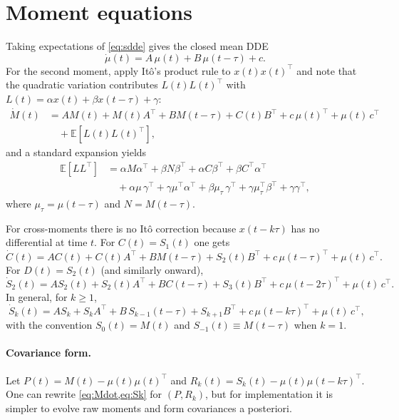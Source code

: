 \documentclass[11pt]{article}
\begin{document}
\section{Moment equations}
Taking expectations of \eqref{eq:sdde} gives the closed mean DDE
\begin{equation}\label{eq:mean}
  \dot\mu(t) = A\,\mu(t) + B\,\mu(t-\tau) + c.
\end{equation}
For the second moment, apply It\^o's product rule to $x(t)x(t)^\top$ and note that the quadratic variation contributes $L(t)L(t)^\top$ with
$L(t)=\alpha x(t)+\beta x(t-\tau)+\gamma$:
\begin{align}\label{eq:Mdot}
  \dot M(t) &= A M(t) + M(t)A^\top + B M(t-\tau) + C(t) B^\top + c\,\mu(t)^\top + \mu(t)\,c^\top
  \nonumber\\
  &\quad + \mathbb{E}\!\left[L(t)L(t)^\top\right],
\end{align}
and a standard expansion yields
\begin{align}\label{eq:ELLT}
\mathbb{E}\!\left[L L^\top\right] &=
  \alpha M\alpha^\top + \beta N\beta^\top + \alpha C\beta^\top + \beta C^\top\alpha^\top
  \nonumber\\
&\quad + \alpha\mu\,\gamma^\top + \gamma\mu^\top\alpha^\top
      + \beta\mu_\tau\,\gamma^\top + \gamma\mu_\tau^\top\beta^\top + \gamma\gamma^\top,
\end{align}
where $\mu_\tau=\mu(t-\tau)$ and $N=M(t-\tau)$.

For cross-moments there is no It\^o correction because $x(t-k\tau)$ has no differential at time $t$.
For $C(t)=S_1(t)$ one gets
\begin{equation}\label{eq:Cd}
  \dot C(t) = A C(t) + C(t)A^\top + B M(t-\tau) + S_2(t) B^\top + c\,\mu(t-\tau)^\top + \mu(t)\,c^\top.
\end{equation}
For $D(t)=S_2(t)$ (and similarly onward),
\begin{equation}\label{eq:Dd}
  \dot S_2(t) = A S_2(t) + S_2(t)A^\top + B C(t-\tau) + S_3(t) B^\top + c\,\mu(t-2\tau)^\top + \mu(t)\,c^\top.
\end{equation}
In general, for $k\ge1$,
\begin{equation}\label{eq:Sk}
  \boxed{\;\dot S_k(t) = A S_k + S_k A^\top + B\,S_{k-1}(t-\tau) + S_{k+1} B^\top + c\,\mu(t-k\tau)^\top + \mu(t)\,c^\top,\;}
\end{equation}
with the convention $S_0(t)=M(t)$ and $S_{-1}(t)\equiv M(t-\tau)$ when $k=1$.

\paragraph{Covariance form.}
Let $P(t)=M(t)-\mu(t)\mu(t)^\top$ and $R_k(t)=S_k(t)-\mu(t)\mu(t-k\tau)^\top$. One can rewrite \eqref{eq:Mdot,eq:Sk} for $(P,R_k)$, but for implementation it is simpler to evolve raw moments and form covariances a posteriori.
\end{document}

